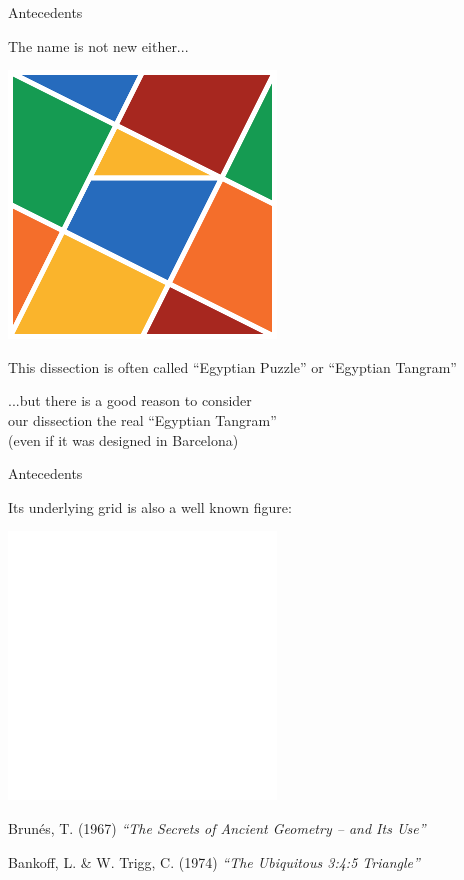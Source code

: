 \documentclass[14pt]{beamer}
\begin{document}

    \begin{frame}{Antecedents}
        \begin{center}
            The name is not new either...

            \bigskip \bigskip

            \includegraphics[height=15ex]{figures/figure000e.pdf}

            \medskip

            {\footnotesize This dissection is often called ``Egyptian Puzzle'' or ``Egyptian Tangram''}

            \bigskip \bigskip

            ...but there is a good reason to consider\\ our dissection the real ``Egyptian Tangram''\\{\footnotesize (even if it was designed in Barcelona)}
        \end{center}
    \end{frame}


    \begin{frame}{Antecedents}
        \begin{center}
            Its underlying grid is also a well known figure:

            \bigskip\bigskip\bigskip

            \includegraphics[height=15ex]{figures/figure002b.pdf}\\

            \bigskip\bigskip

            {\footnotesize Brunés, T. (1967) \emph{``The Secrets of Ancient Geometry -- and Its Use''}}

            \medskip

            {\footnotesize Bankoff, L. \& W. Trigg, C. (1974) \emph{``The Ubiquitous 3:4:5 Triangle''}}
        \end{center}
    \end{frame}
\end{document}
